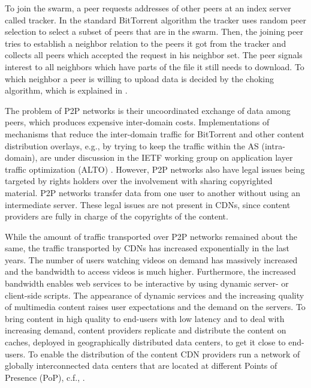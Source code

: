 To join the swarm, a peer requests addresses of other peers at an index server called tracker.
In the standard BitTorrent algorithm the tracker uses random peer selection to select a subset of peers that are in the swarm.
Then, the joining peer tries to establish a neighbor relation to the peers it got from the tracker and collects all peers which accepted the request in his neighbor set.
The peer signals interest to all neighbors which have parts of the file it still needs to download.
To which neighbor a peer is willing to upload data is decided by the choking algorithm, which is explained in \cite{cohen:bt}.

The problem of P2P networks is their uncoordinated exchange of data among peers, which produces expensive inter-domain costs.
Implementations of mechanisms that reduce the inter-domain traffic for BitTorrent and other content distribution overlays, e.g., by trying to keep the traffic within the AS (intra-domain), are under discussion in the IETF working group on application layer traffic optimization (ALTO) \cite{alimi2014application}.
However, P2P networks also have legal issues being targeted by rights holders over the involvement with sharing copyrighted material.
P2P networks transfer data from one user to another without using an intermediate server.
These legal issues are not present in CDNs, since content providers are fully in charge of the copyrights of the content.

While the amount of traffic transported over P2P networks remained about the same, the traffic transported by CDNs has increased exponentially \cite{cisco2016} in the last years.
The number of users watching videos on demand has massively increased and the bandwidth to access videos is much higher.
Furthermore, the increased bandwidth enables web services to be interactive by using dynamic server- or client-side scripts.
The appearance of dynamic services and the increasing quality of multimedia content raises user expectations and the demand on the servers.
To bring content in high quality to end-users with low latency and to deal with increasing demand, content providers replicate and distribute the content on caches, deployed in geographically distributed data centers, to get it close to end-users.
To enable the distribution of the content CDN providers run a network of globally interconnected data centers that are located at different Points of Presence (PoP), c.f., .

